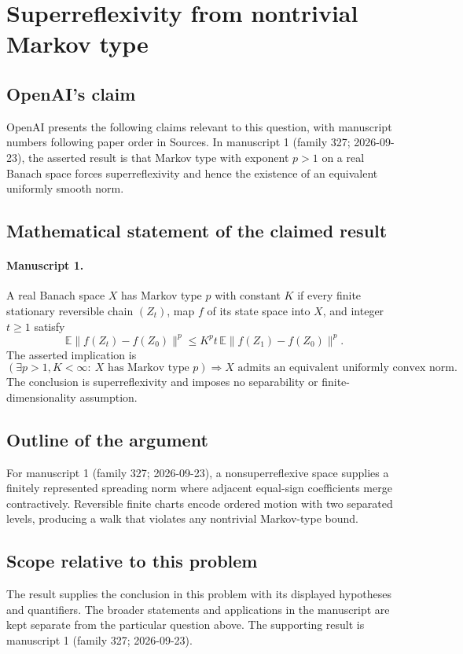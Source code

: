 \documentclass[11pt]{article}
\begin{document}
\section*{Superreflexivity from nontrivial Markov type}

\subsection{OpenAI's claim}
OpenAI presents the following claims relevant to this question, with manuscript numbers following paper order in Sources. In manuscript 1 (family 327; 2026-09-23), the asserted result is that Markov type with exponent $p>1$ on a real Banach space forces superreflexivity and hence the existence of an equivalent uniformly smooth norm.

\subsection{Mathematical statement of the claimed result}
\paragraph{Manuscript 1.}
A real Banach space $X$ has Markov type $p$ with constant $K$ if every finite stationary reversible chain $(Z_t)$, map $f$ of its state space into $X$, and integer $t\ge1$ satisfy
\[
 \mathbb E\|f(Z_t)-f(Z_0)\|^p\le K^pt\,\mathbb E\|f(Z_1)-f(Z_0)\|^p.
\]
The asserted implication is
\[
 (\exists p>1,K<\infty:\ X\text{ has Markov type }p)
 \Longrightarrow X\text{ admits an equivalent uniformly convex norm}.
\]
The conclusion is superreflexivity and imposes no separability or finite-dimensionality assumption.

\subsection{Outline of the argument}
For manuscript 1 (family 327; 2026-09-23), a nonsuperreflexive space supplies a finitely represented spreading norm where adjacent equal-sign coefficients merge contractively. Reversible finite charts encode ordered motion with two separated levels, producing a walk that violates any nontrivial Markov-type bound.

\subsection{Scope relative to this problem}
The result supplies the conclusion in this problem with its displayed hypotheses and quantifiers. The broader statements and applications in the manuscript are kept separate from the particular question above. The supporting result is manuscript 1 (family 327; 2026-09-23).
\end{document}

